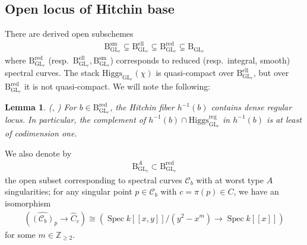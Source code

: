 \documentclass[11pt,oneside,a4paper,mathscr]{amsart}
\newtheorem{lemma}[thm]{Lemma}
\theoremstyle{definition}
\renewcommand{\geq}{\geqslant}
\newcommand{\cC}{\mathcal{C}}
\newcommand{\rB}{\mathrm{B}}
\newcommand{\Spec}{\operatorname{Spec}}
\newcommand{\GL}{\operatorname{GL}}
\newcommand{\Hig}{\mathrm{Higgs}}
\begin{document}
\subsection{Open locus of Hitchin base}
There are derived open subschemes 
\begin{align*}
    \mathrm{B}_{\GL_r}^{\mathrm{sm}} \subsetneq \mathrm{B}_{\GL_r}^{\mathrm{ell}} \subsetneq \mathrm{B}_{\GL_r}^{\mathrm{red}} \subsetneq \mathrm{B}_{\GL_r}
\end{align*}
where $\mathrm{B}_{\GL_r}^{\mathrm{red}}$ (resp.\ $\mathrm{B}_{\GL_r}^{\mathrm{ell}}, \mathrm{B}_{\GL_r}^{\mathrm{sm}}$) corresponds to reduced (resp.\ integral, smooth) spectral curves. 
The stack $\Hig_{\GL_r}(\chi)$ is quasi-compact over $\mathrm{B}_{\GL_r}^{\mathrm{ell}}$, but over 
$\mathrm{B}_{\GL_r}^{\mathrm{red}}$ it is not quasi-compact. We will note the following: 
\begin{lemma}\label{lem:dense}\emph{(\cite[Remark~2.5]{TodaGL2}, \cite[Fact~2.4]{MRVF2})}
    For $b\in \rB_{\GL_r}^{\mathrm{red}}$, the Hitchin fiber 
    $h^{-1}(b)$ contains dense regular locus. 
    In particular, the complement of $h^{-1}(b) \cap \Hig_{\GL_r}^{\mathrm{reg}}$ in $h^{-1}(b)$ is at least of codimension one. 
\end{lemma}

We also denote by 
\begin{align*}
\rB_{\GL_r}^A \subset \rB_{\GL_r}^{\mathrm{red}}
\end{align*}
the open subset corresponding to spectral curves $\cC_b$ with at worst type $A$ singularities; for any singular point $p\in \cC_b$ with $c=\pi(p) \in C$, 
we have an isomorphism 
\begin{align}\label{loc:model}
(\widehat{(\cC_b)}_{p} \to \widehat{C}_c) \cong 
    (\Spec k[[x, y]]/(y^2-x^m) \to \Spec k[[x]])
\end{align}
for some $m\in \mathbb{Z}_{\geq 2}$. 
\end{document}
